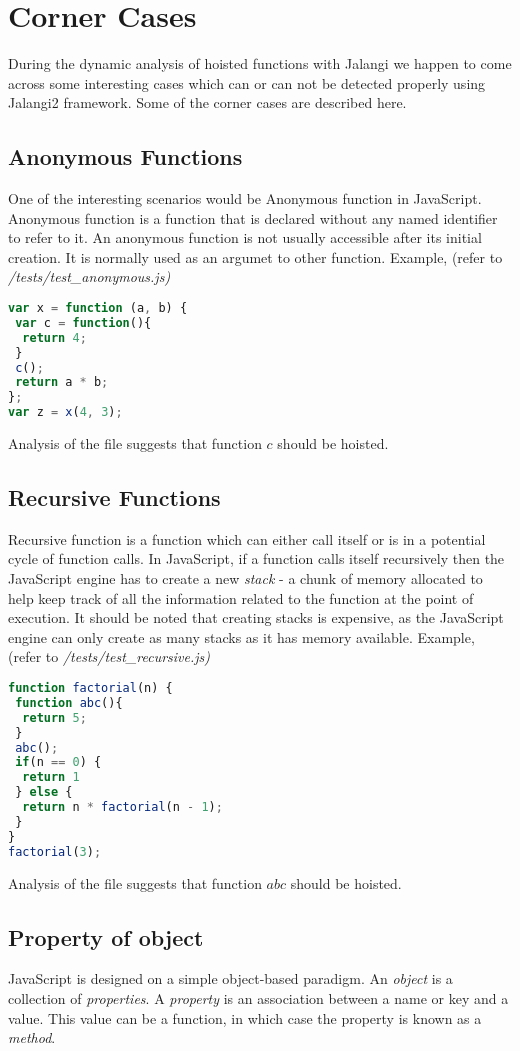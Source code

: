 \documentclass[accentcolor=tud0b,12pt,paper=a4]{tudreport}
\begin{document}
\chapter{Corner Cases}
During the dynamic analysis of hoisted functions with Jalangi we happen to come across some interesting cases which can or can not be detected properly using Jalangi2 framework. Some of the corner cases are described here.
\section{Anonymous Functions}
One of the interesting scenarios would be Anonymous function in JavaScript. Anonymous function is a function that is declared  without any named identifier to refer to it. An anonymous function is not usually accessible after its initial creation. It is normally used as an argumet to other function. Example, (refer to \emph{/tests/test\_anonymous.js)}
\begin{lstlisting}[language=JavaScript]
var x = function (a, b) {
 var c = function(){
  return 4;
 }
 c();
 return a * b;
};
var z = x(4, 3);
\end{lstlisting}
Analysis of the file suggests that function $c$ should be hoisted.

\section{Recursive Functions}
Recursive function is a function which can either call itself or is in a potential cycle of function calls. In JavaScript, if a function calls itself recursively then the JavaScript engine has to create a new \emph{stack} - a chunk of memory allocated to help keep track of all the information related to the function at the point of execution. It should be noted that creating stacks is expensive, as the JavaScript engine can only create as many stacks as it has memory available. Example, (refer to \emph{/tests/test\_recursive.js)}
\begin{lstlisting}[language=JavaScript]
function factorial(n) {	
 function abc(){
  return 5;
 }
 abc();
 if(n == 0) {
  return 1
 } else {
  return n * factorial(n - 1);
 }
}
factorial(3);
\end{lstlisting}
Analysis of the file suggests that function $abc$ should be hoisted.

\section{Property of object}
JavaScript is designed on a simple object-based paradigm. An \emph{object} is a collection of \emph{properties}. A \emph{property} is an association between a name or key and a value. This value can be a function, in which case the property is known as a \emph{method}.
\end{document}
